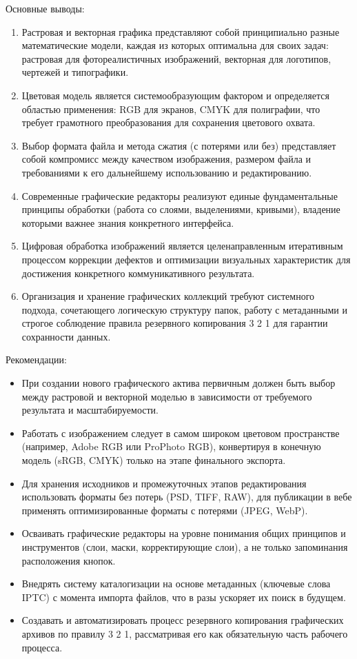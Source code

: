 \documentclass{SibFU-docs}
\begin{document}
Основные выводы:
\begin{enumerate}
\item Растровая и векторная графика представляют собой принципиально разные математические модели, каждая из которых оптимальна для своих задач: растровая для фотореалистичных изображений, векторная для логотипов, чертежей и типографики.
\item Цветовая модель является системообразующим фактором и определяется областью применения: RGB для экранов, CMYK для полиграфии, что требует грамотного преобразования для сохранения цветового охвата.
\item Выбор формата файла и метода сжатия (с потерями или без) представляет собой компромисс между качеством изображения, размером файла и требованиями к его дальнейшему использованию и редактированию.
\item Современные графические редакторы реализуют единые фундаментальные принципы обработки (работа со слоями, выделениями, кривыми), владение которыми важнее знания конкретного интерфейса.
\item Цифровая обработка изображений является целенаправленным итеративным процессом коррекции дефектов и оптимизации визуальных характеристик для достижения конкретного коммуникативного результата.
\item Организация и хранение графических коллекций требуют системного подхода, сочетающего логическую структуру папок, работу с метаданными и строгое соблюдение правила резервного копирования 3 2 1 для гарантии сохранности данных.
\end{enumerate}

Рекомендации:
\begin{itemize}[label=-]
\item При создании нового графического актива первичным должен быть выбор между растровой и векторной моделью в зависимости от требуемого результата и масштабируемости.
\item Работать с изображением следует в самом широком цветовом пространстве (например, Adobe RGB или ProPhoto RGB), конвертируя в конечную модель (sRGB, CMYK) только на этапе финального экспорта.
\item Для хранения исходников и промежуточных этапов редактирования использовать форматы без потерь (PSD, TIFF, RAW), для публикации в вебе применять оптимизированные форматы с потерями (JPEG, WebP).
\item Осваивать графические редакторы на уровне понимания общих принципов и инструментов (слои, маски, корректирующие слои), а не только запоминания расположения кнопок.
\item Внедрять систему каталогизации на основе метаданных (ключевые слова IPTC) с момента импорта файлов, что в разы ускоряет их поиск в будущем.
\item Создавать и автоматизировать процесс резервного копирования графических архивов по правилу 3 2 1, рассматривая его как обязательную часть рабочего процесса.
\end{itemize}
\end{document}
